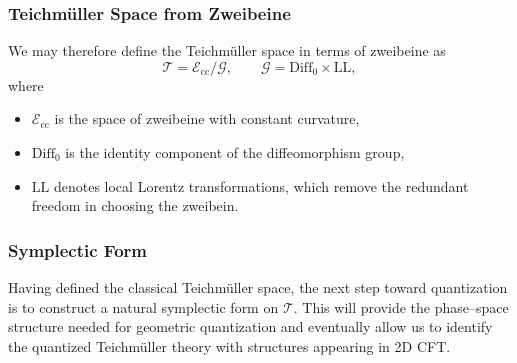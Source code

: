 \subsubsection{Teichmüller Space from Zweibeine}

We may therefore define the Teichmüller space in terms of zweibeine as
\begin{equation}
    \mathscr{T}
    = \mathscr{E}_{\mathrm{cc}} / \mathscr{G},
    \qquad
    \mathscr{G} = \mathrm{Diff}_0 \times \mathrm{LL},
\end{equation}
where
\begin{itemize}
    \item $\mathscr{E}_{\mathrm{cc}}$ is the space of zweibeine with constant curvature,
    \item $\mathrm{Diff}_0$ is the identity component of the diffeomorphism group,
    \item $\mathrm{LL}$ denotes local Lorentz transformations, which remove the 
    redundant freedom in choosing the zweibein.
\end{itemize}

\subsubsection{Symplectic Form}

Having defined the classical Teichmüller space, 
the next step toward quantization is to construct a natural symplectic form 
on $\mathscr{T}$. This will provide the phase–space structure needed 
for geometric quantization and eventually allow us to identify the 
quantized Teichmüller theory with structures appearing in 2D CFT.

